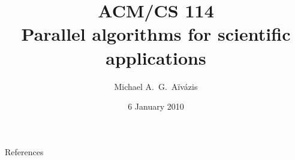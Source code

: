 \documentclass{beamer}
\title[ACM/CS 114 -- Winter 2010]{ACM/CS 114 \\ Parallel algorithms for scientific applications}
\author{Michael A.~G.~A\"iv\'azis}
\institute{California Institute of Technology}
\date{6 January 2010}
\begin{document}
\begin{frame}
  \titlepage
\end{frame}





\begin{frame}{References}


\end{frame}
\end{document}
